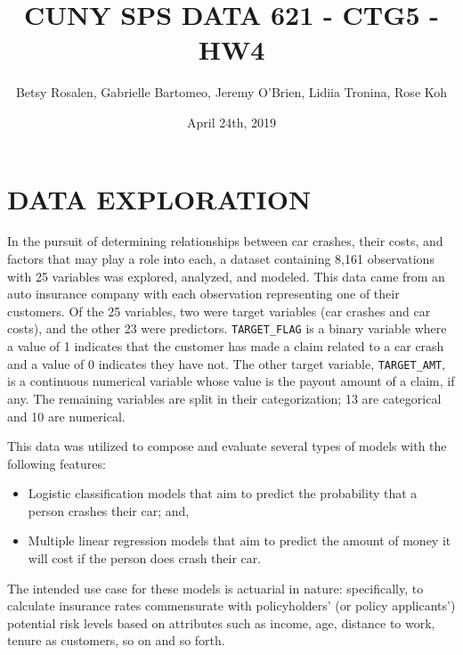 \documentclass[]{article}
\title{CUNY SPS DATA 621 - CTG5 - HW4}
\author{Betsy Rosalen, Gabrielle Bartomeo, Jeremy O'Brien, Lidiia Tronina, Rose
Koh}
\date{April 24th, 2019}
\providecommand{\tightlist}{%
  \setlength{\itemsep}{0pt}\setlength{\parskip}{0pt}}
\begin{document}
\maketitle

{
\setcounter{tocdepth}{2}
\tableofcontents
}
\newpage

\section{DATA EXPLORATION}\label{data-exploration}

In the pursuit of determining relationships between car crashes, their
costs, and factors that may play a role into each, a dataset containing
8,161 observations with 25 variables was explored, analyzed, and
modeled. This data came from an auto insurance company with each
observation representing one of their customers. Of the 25 variables,
two were target variables (car crashes and car costs), and the other 23
were predictors. \texttt{TARGET\_FLAG} is a binary variable where a
value of 1 indicates that the customer has made a claim related to a car
crash and a value of 0 indicates they have not. The other target
variable, \texttt{TARGET\_AMT}, is a continuous numerical variable whose
value is the payout amount of a claim, if any. The remaining variables
are split in their categorization; 13 are categorical and 10 are
numerical.

This data was utilized to compose and evaluate several types of models
with the following features:

\begin{itemize}
\tightlist
\item
  Logistic classification models that aim to predict the probability
  that a person crashes their car; and,
\item
  Multiple linear regression models that aim to predict the amount of
  money it will cost if the person does crash their car.
\end{itemize}

The intended use case for these models is actuarial in nature:
specifically, to calculate insurance rates commensurate with
policyholders' (or policy applicants') potential risk levels based on
attributes such as income, age, distance to work, tenure as customers,
so on and so forth.
\end{document}
